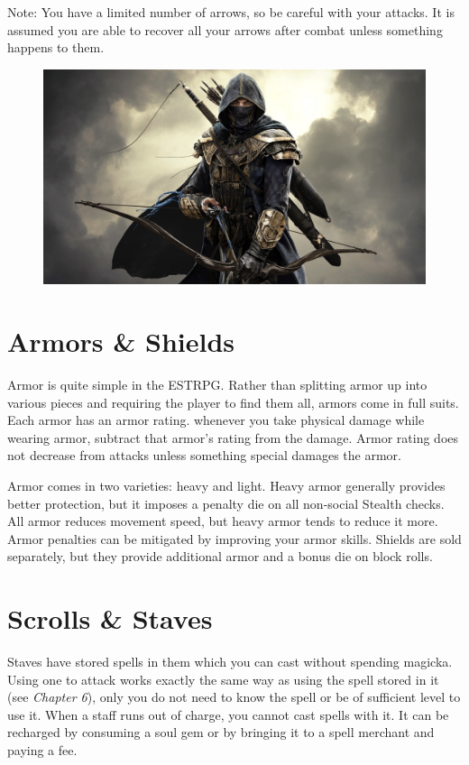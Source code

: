 \documentclass[12pt]{book}
\begin{document}
Note: You have a limited number of arrows, so be careful with your attacks. It is assumed you are able to recover all your arrows after combat unless something happens to them.

\begin{figure}[H]
	\includegraphics[width=\textwidth]{bretonarcher.png}
\end{figure}

\section{Armors \& Shields}

Armor is quite simple in the ESTRPG. Rather than splitting armor up into various pieces and requiring the player to find them all, armors come in full suits. Each armor has an armor rating. whenever you take physical damage while wearing armor, subtract that armor's rating from the damage. Armor rating does not decrease from attacks unless something special damages the armor.

Armor comes in two varieties: heavy and light. Heavy armor generally provides better protection, but it imposes a penalty die on all non-social Stealth checks. All armor reduces movement speed, but heavy armor tends to reduce it more. Armor penalties can be mitigated by improving your armor skills. Shields are sold separately, but they provide additional armor and a bonus die on block rolls.

\section{Scrolls \& Staves}

Staves have stored spells in them which you can cast without spending magicka. Using one to attack works exactly the same way as using the spell stored in it (see \textit{Chapter 6}), only you do not need to know the spell or be of sufficient level to use it. When a staff runs out of charge, you cannot cast spells with it. It can be recharged by consuming a soul gem or by bringing it to a spell merchant and paying a fee.
\end{document}

